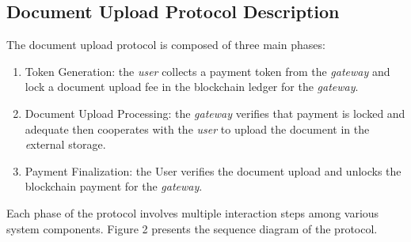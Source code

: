 \documentclass[conference]{IEEEtran}
\begin{document}
\subsection{Document Upload Protocol Description}
The document upload protocol is composed of three main phases:
\begin{enumerate}
\item Token Generation: the {\it user} collects a payment token from the {\it gateway} and lock a document upload fee in the blockchain ledger for the {\it gateway}.
\item Document Upload Processing: the {\it gateway} verifies that payment is locked and adequate then cooperates with the \textit{user} to upload the document in the {\textit external storage}.
\item Payment Finalization: the User verifies the document upload and unlocks the blockchain payment for the {\it gateway}.
\end{enumerate}
Each phase of the protocol involves multiple interaction steps among various system components. Figure 2 presents the sequence diagram of the protocol.
\end{document}
